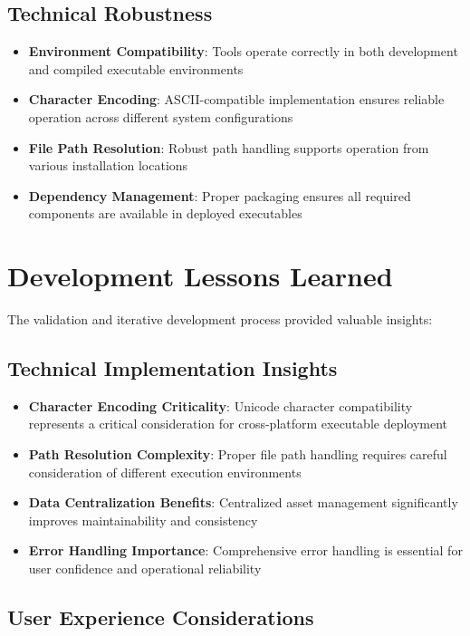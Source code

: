 \documentclass[binding=0.6cm]{sapthesis}
\begin{document}
\subsection{Technical Robustness}

\begin{itemize}
    \item \textbf{Environment Compatibility}: Tools operate correctly in both development and compiled executable environments
    \item \textbf{Character Encoding}: ASCII-compatible implementation ensures reliable operation across different system configurations
    \item \textbf{File Path Resolution}: Robust path handling supports operation from various installation locations
    \item \textbf{Dependency Management}: Proper packaging ensures all required components are available in deployed executables
\end{itemize}

\section{Development Lessons Learned}

The validation and iterative development process provided valuable insights:

\subsection{Technical Implementation Insights}

\begin{itemize}
    \item \textbf{Character Encoding Criticality}: Unicode character compatibility represents a critical consideration for cross-platform executable deployment
    \item \textbf{Path Resolution Complexity}: Proper file path handling requires careful consideration of different execution environments
    \item \textbf{Data Centralization Benefits}: Centralized asset management significantly improves maintainability and consistency
    \item \textbf{Error Handling Importance}: Comprehensive error handling is essential for user confidence and operational reliability
\end{itemize}

\subsection{User Experience Considerations}
\end{document}
